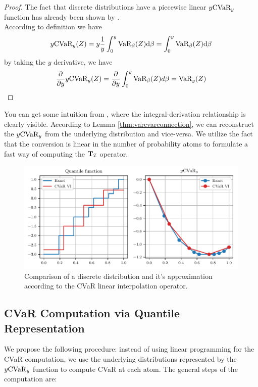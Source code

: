 \begin{proof}
The fact that discrete distributions have a piecewise linear $y\text{CVaR}_y$ function has already been shown by \citet{rockafellar2000optimization}.
\\
According to definition  we have
\begin{equation*}
y\text{CVaR}_y(Z) = y\dfrac{1}{y}\int_0^y \text{VaR}_\beta(Z) \text{d} \beta = \int_0^y \text{VaR}_\beta(Z) \text{d} \beta
\end{equation*}
by taking the $y$ derivative, we have
\begin{equation*}
\dfrac{\partial}{\partial y} y \text{CVaR}_y(Z) = \dfrac{\partial}{\partial y} \int_0^y \text{VaR}_\beta(Z) d\beta = \text{VaR}_y(Z)
\end{equation*}
\end{proof}
You can get some intuition from , where the integral-derivation relationship is clearly visible.
According to Lemma \ref{thm:varcvarconnection}, we can reconstruct the $y\text{CVaR}_y$ from the underlying distribution and vice-versa. We utilize the fact that the conversion is linear in the number of probability atoms to formulate a fast way of computing the $\mathbf{T}_{\mathcal{I}}$ operator.

\begin{figure}
\center
\includegraphics[width=0.8\linewidth]{gfx/cvar_visualized.pdf}
\caption{Comparison of a discrete distribution and it's approximation according to the CVaR linear interpolation operator.}
\label{fig:cvarvisual}
\end{figure}

\subsection{CVaR Computation via Quantile Representation}

We propose the following procedure: instead of using linear programming for the CVaR computation, we use the underlying distributions represented by the $y\text{CVaR}_y$ function to compute CVaR at each atom. The general steps of the computation are:

